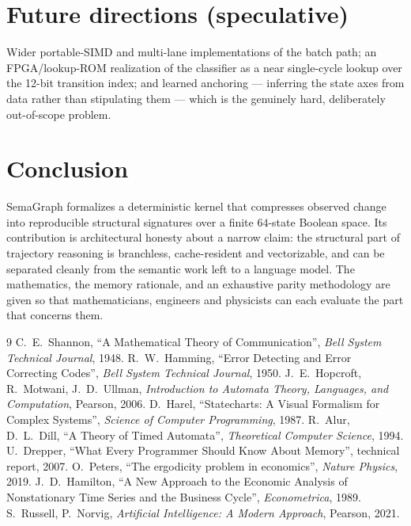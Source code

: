 \documentclass[11pt,a4paper]{article}
\begin{document}
\section{Future directions (speculative)}
Wider portable-SIMD and multi-lane implementations of the batch path; an
FPGA/lookup-ROM realization of the classifier as a near single-cycle lookup over the
12-bit transition index; and learned anchoring --- inferring the state axes from
data rather than stipulating them --- which is the genuinely hard, deliberately
out-of-scope problem.

\section{Conclusion}
SemaGraph formalizes a deterministic kernel that compresses observed change into
reproducible structural signatures over a finite $64$-state Boolean space. Its
contribution is architectural honesty about a narrow claim: the structural part of
trajectory reasoning is branchless, cache-resident and vectorizable, and can be
separated cleanly from the semantic work left to a language model. The mathematics,
the memory rationale, and an exhaustive parity methodology are given so that
mathematicians, engineers and physicists can each evaluate the part that concerns
them.

\begin{thebibliography}{9}
 C.~E.~Shannon, ``A Mathematical Theory of Communication'',
\emph{Bell System Technical Journal}, 1948.
 R.~W.~Hamming, ``Error Detecting and Error Correcting Codes'',
\emph{Bell System Technical Journal}, 1950.
 J.~E.~Hopcroft, R.~Motwani, J.~D.~Ullman, \emph{Introduction
to Automata Theory, Languages, and Computation}, Pearson, 2006.
 D.~Harel, ``Statecharts: A Visual Formalism for Complex
Systems'', \emph{Science of Computer Programming}, 1987.
 R.~Alur, D.~L.~Dill, ``A Theory of Timed Automata'',
\emph{Theoretical Computer Science}, 1994.
 U.~Drepper, ``What Every Programmer Should Know About
Memory'', technical report, 2007.
 O.~Peters, ``The ergodicity problem in economics'',
\emph{Nature Physics}, 2019.
 J.~D.~Hamilton, ``A New Approach to the Economic Analysis of
Nonstationary Time Series and the Business Cycle'', \emph{Econometrica}, 1989.
 S.~Russell, P.~Norvig, \emph{Artificial Intelligence: A Modern
Approach}, Pearson, 2021.
\end{thebibliography}
\end{document}
